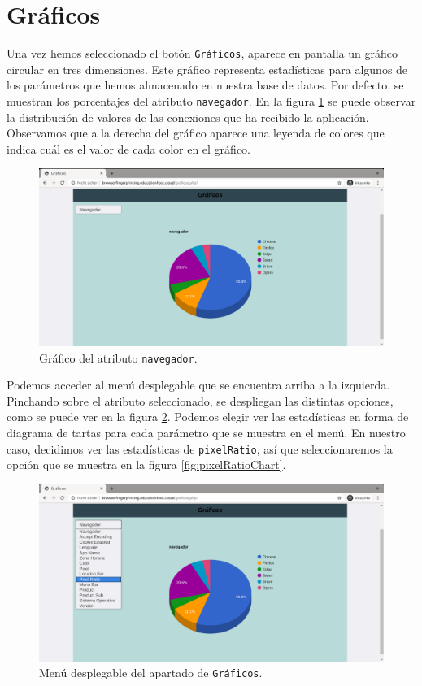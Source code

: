 \section{Gráficos}

Una vez hemos seleccionado el botón \texttt{Gráficos}, aparece en pantalla un gráfico circular en tres dimensiones. 
Este gráfico representa estadísticas para algunos de los parámetros que hemos almacenado en nuestra base de datos. Por defecto, se muestran los porcentajes del atributo \texttt{navegador}. En la figura \ref{fig:navegadorChart} se puede observar la distribución de valores de las conexiones que ha recibido la aplicación. Observamos que a la derecha del gráfico aparece una leyenda de colores que indica cuál es el valor de cada color en el gráfico. 

\begin{figure}[tbp]
	\centering
	\includegraphics[width=1\textwidth]{Images/navegadorChart.png}
	\caption{Gráfico del atributo \texttt{navegador}.}
	\label{fig:navegadorChart}
\end{figure}

Podemos acceder al menú desplegable que se encuentra arriba a la izquierda. Pinchando sobre el atributo seleccionado, se despliegan las distintas opciones, como se puede ver en la figura \ref{fig:menuChart}. Podemos elegir ver las estadísticas en forma de diagrama de tartas para cada parámetro que se muestra en el menú. En nuestro caso, decidimos ver las estadísticas de \texttt{pixelRatio}, así que seleccionaremos la opción que se muestra en la figura \ref{fig:pixelRatioChart}.

\begin{figure}[tbp]
	\centering
	\includegraphics[width=1\textwidth]{Images/menuChart.png}
	\caption{Menú desplegable del apartado de \texttt{Gráficos}.}
	\label{fig:menuChart}
\end{figure}

